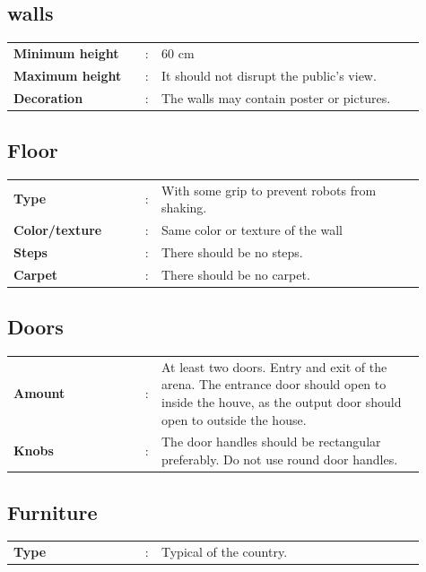 \documentclass[11pt, twoside, openright, a4paper, chapterprefix]{article}
\begin{document}
\subsection{walls}

\begin{tabular}{ p{0.3\linewidth} p{0.01\linewidth} p{0.6\linewidth}}
    \textbf{Minimum height}       & : & 60 cm \\
    \textbf{Maximum height}       & : & It should not disrupt the public's view. \\
    \textbf{Decoration}           & : & The walls may contain poster or pictures. 
\end{tabular}

\subsection{Floor}

\begin{tabular}{ p{0.3\linewidth} p{0.01\linewidth} p{0.6\linewidth}}
    \textbf{Type}                 & : & With some grip to prevent robots from shaking. \\
    \textbf{Color/texture}        & : & Same color or texture of the wall \\
    \textbf{Steps}                & : & There should be no steps. \\
    \textbf{Carpet}               & : & There should be no carpet. 
\end{tabular}

\subsection{Doors}

\begin{tabular}{ p{0.3\linewidth} p{0.01\linewidth} p{0.6\linewidth}}
    \textbf{Amount}           & : & At least two doors. Entry and exit of the arena. The entrance door should open to inside the houve, as the output door should open to outside the house. \\
    \textbf{Knobs}            & : & The door handles should be rectangular preferably. Do not use round door handles. 
\end{tabular}

\subsection{Furniture}

\begin{tabular}{ p{0.3\linewidth} p{0.01\linewidth} p{0.6\linewidth}}
    \textbf{Type}       & : & Typical of the country. \\
\end{tabular}
\end{document}
